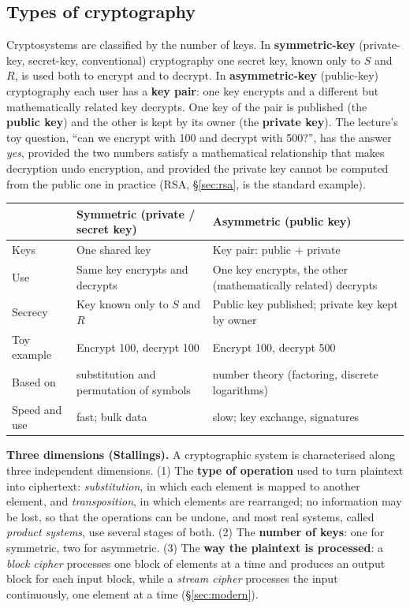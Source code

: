 \subsection{Types of cryptography}
Cryptosystems are classified by the number of keys. In \textbf{symmetric-key} (private-key, secret-key, conventional) cryptography one secret key, known only to $S$ and $R$, is used both to encrypt and to decrypt. In \textbf{asymmetric-key} (public-key) cryptography each user has a \textbf{key pair}: one key encrypts and a different but mathematically related key decrypts. One key of the pair is published (the \textbf{public key}) and the other is kept by its owner (the \textbf{private key}). The lecture's toy question, ``can we encrypt with 100 and decrypt with 500?'', has the answer \emph{yes}, provided the two numbers satisfy a mathematical relationship that makes decryption undo encryption, and provided the private key cannot be computed from the public one in practice (RSA, \S\ref{sec:rsa}, is the standard example).
\begin{center}
\small
\begin{tabularx}{\textwidth}{@{}l X X@{}}
\toprule
 & \textbf{Symmetric} (private / secret key) & \textbf{Asymmetric} (public key) \\
\midrule
Keys & One shared key & Key pair: public + private \\
Use & Same key encrypts and decrypts & One key encrypts, the other (mathematically related) decrypts \\
Secrecy & Key known only to $S$ and $R$ & Public key published; private key kept by owner \\
Toy example & Encrypt 100, decrypt 100 & Encrypt 100, decrypt 500 \\
Based on & substitution and permutation of symbols & number theory (factoring, discrete logarithms) \\
Speed and use & fast; bulk data & slow; key exchange, signatures \\
\bottomrule
\end{tabularx}
\end{center}

\textbf{Three dimensions (Stallings).} A cryptographic system is characterised along three independent dimensions. (1) The \textbf{type of operation} used to turn plaintext into ciphertext: \emph{substitution}, in which each element is mapped to another element, and \emph{transposition}, in which elements are rearranged; no information may be lost, so that the operations can be undone, and most real systems, called \emph{product systems}, use several stages of both. (2) The \textbf{number of keys}: one for symmetric, two for asymmetric. (3) The \textbf{way the plaintext is processed}: a \emph{block cipher} processes one block of elements at a time and produces an output block for each input block, while a \emph{stream cipher} processes the input continuously, one element at a time (\S\ref{sec:modern}).


